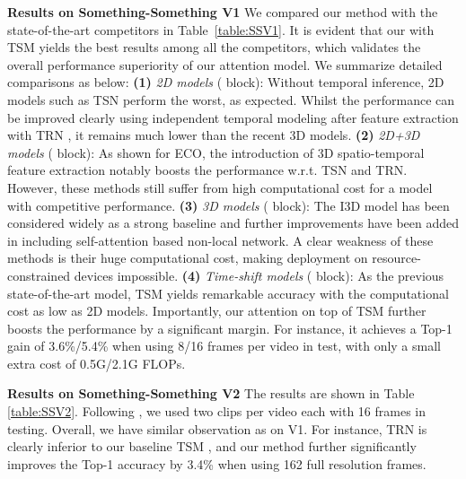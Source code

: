 \documentclass[runningheads]{llncs}
\newcommand{\keypoint}[1]{\vspace{0.1cm}\noindent\textbf{#1}\quad}
\begin{document}
\keypoint{Results on Something-Something V1} 
We compared our \shortname{} method with the state-of-the-art competitors in Table~\ref{table:SSV1}.
It is evident that our \shortname{} with TSM \cite{lin2019tsm} yields the best results among all the competitors, which validates the overall performance superiority of our attention model.
We summarize detailed comparisons as below:
{\bf (1)} {\em 2D models} ( block):
Without temporal inference, 2D models such as TSN \cite{wang2016temporal} perform the worst, as expected. Whilst the performance can be
improved clearly using independent temporal modeling after feature extraction with TRN \cite{zhou2018temporal}, it remains much lower than the recent 3D models.
{\bf (2)} {\em 2D+3D models} ( block):
As shown for ECO, the introduction of 3D spatio-temporal feature extraction notably boosts the performance w.r.t. TSN and TRN.
However, these methods still suffer from high computational cost for a model with competitive performance.
{\bf (3)} {\em 3D models} ( block):
The I3D model \cite{carreira2017quo} has been considered widely as a strong baseline and further improvements have been added in \cite{feichtenhofer2019slowfast,wang2018non,wang2018videos} including self-attention based non-local network. 
A clear weakness of these methods
is their huge computational cost, making deployment on resource-constrained devices impossible.
{\bf (4)} {\em Time-shift models} ( block): As the previous state-of-the-art model, TSM \cite{lin2019tsm} yields remarkable accuracy with the computational cost as low as 2D models. 
Importantly, our \shortname{} attention on top of TSM 
further boosts the performance by a significant margin.
For instance, it
achieves a Top-1 gain of 3.6\%/5.4\% when using 8/16 frames per video in test, with only a small extra cost of 0.5G/2.1G FLOPs.







\keypoint{Results on Something-Something V2}
The results are shown  in Table \ref{table:SSV2}.
Following \cite{lin2019tsm},
we used two clips per video each with 16 frames
in testing.
Overall, we have similar observation as on V1.
For instance, TRN \cite{zhou2018temporal} is clearly inferior to our baseline TSM \cite{lin2019tsm}, and our method further significantly improves the Top-1 accuracy by 3.4\% when using 162 full resolution frames. 
\end{document}
